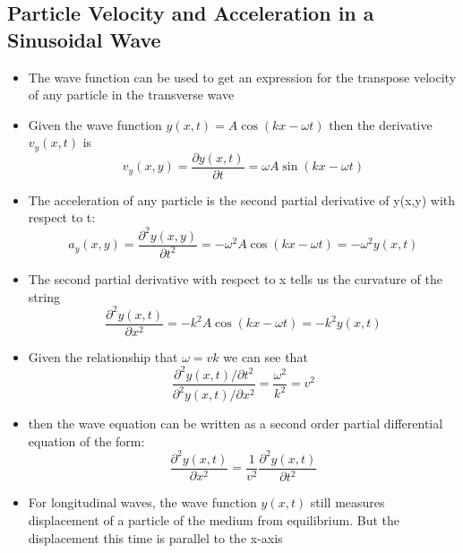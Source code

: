 \documentclass[11pt, a4paper]{article}
\begin{document}
\subsection{Particle Velocity and Acceleration in a Sinusoidal Wave}
\begin{itemize}
    \item The wave function can be used to get an expression for the transpose velocity of any
        particle in the transverse wave
    \item Given the wave function $y(x,t) = A\cos(kx - \omega t)$ then the derivative $v_{y}(x,t)$ is
        \begin{equation}
            v_{y}(x,y) = \frac{\partial y(x,t)}{\partial t} = \omega A\sin(kx - \omega t)
        \end{equation}
    \item The acceleration of any particle is the second partial derivative of y(x,y) with respect to t:
        \begin{equation}
            a_y(x,y) = \frac{\partial^{2}y(x,y)}{\partial t^2} = -\omega^{2}A\cos(kx-\omega t)
            = -\omega^{2}y(x,t)
        \end{equation}
    \item The second partial derivative with respect to x tells us the curvature of the string
        \begin{equation}
            \frac{\partial^{2}y(x,t)}{\partial x^{2}} = -k^2A\cos(kx - \omega t) = -k^2y(x,t)
        \end{equation}
    \item Given the relationship that $\omega = vk$ we can see that
        \begin{equation}
            \frac{\partial^2y(x,t)/\partial t^2}{\partial^2y(x,t)/\partial x^2} =
            \frac{\omega^2}{k^2} = v^2
        \end{equation}
    \item then the wave equation can be written as a second order partial differential equation of the
        form:
        \begin{equation}
            \frac{\partial^2y(x,t)}{\partial x^2} =
            \frac{1}{v^2}\frac{\partial^2y(x,t)}{\partial t^2}
        \end{equation}
    \item For longitudinal waves, the wave function $y(x,t)$ still measures displacement of a particle
        of the medium from equilibrium. But the displacement this time is parallel to the x-axis
\end{itemize}
\end{document}
